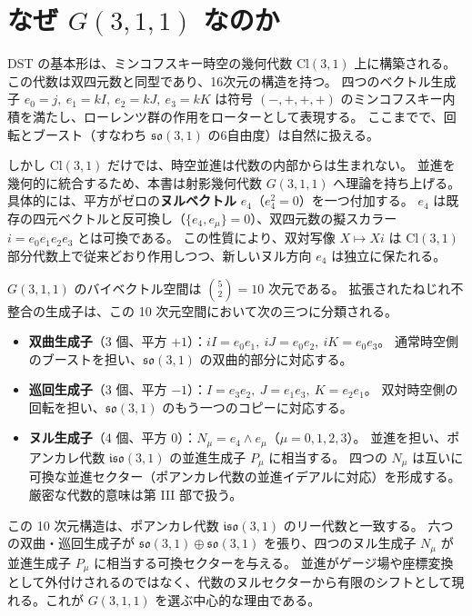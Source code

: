 \documentclass[dvipdfmx,a4paper,oneside]{jsbook}
\numberwithin{equation}{chapter}
\begin{document}
\section*{なぜ \(G(3,1,1)\) なのか}

DST の基本形は、ミンコフスキー時空の幾何代数 \(\mathrm{Cl}(3,1)\) 上に構築される。
この代数は双四元数と同型であり、16次元の構造を持つ。
四つのベクトル生成子 \(e_0 = j,\ e_1 = kI,\ e_2 = kJ,\ e_3 = kK\) は符号 \((-,+,+,+)\) のミンコフスキー内積を満たし、ローレンツ群の作用をローターとして表現する。
ここまでで、回転とブースト（すなわち \(\mathfrak{so}(3,1)\) の6自由度）は自然に扱える。

しかし \(\mathrm{Cl}(3,1)\) だけでは、時空並進は代数の内部からは生まれない。
並進を幾何的に統合するため、本書は射影幾何代数 \(G(3,1,1)\) へ理論を持ち上げる。
具体的には、平方がゼロの\textbf{ヌルベクトル} \(e_4\)（\(e_4^2 = 0\)）を一つ付加する。
\(e_4\) は既存の四元ベクトルと反可換し（\(\{e_4, e_\mu\} = 0\)）、双四元数の擬スカラー \(i = e_0 e_1 e_2 e_3\) とは可換である。
この性質により、双対写像 \(X \mapsto Xi\) は \(\mathrm{Cl}(3,1)\) 部分代数上で従来どおり作用しつつ、新しいヌル方向 \(e_4\) は独立に保たれる。

\(G(3,1,1)\) のバイベクトル空間は \(\binom{5}{2} = 10\) 次元である。
拡張されたねじれ不整合の生成子は、この 10 次元空間において次の三つに分類される。

\begin{itemize}[leftmargin=2em]
  \item \textbf{双曲生成子}（3 個、平方 \(+1\)）：\(iI = e_0 e_1,\ iJ = e_0 e_2,\ iK = e_0 e_3\)。
  通常時空側のブーストを担い、\(\mathfrak{so}(3,1)\) の双曲的部分に対応する。
  \item \textbf{巡回生成子}（3 個、平方 \(-1\)）：\(I = e_3 e_2,\ J = e_1 e_3,\ K = e_2 e_1\)。
  双対時空側の回転を担い、\(\mathfrak{so}(3,1)\) のもう一つのコピーに対応する。
  \item \textbf{ヌル生成子}（4 個、平方 \(0\)）：\(N_\mu = e_4 \wedge e_\mu\)（\(\mu = 0,1,2,3\)）。
  並進を担い、ポアンカレ代数 \(\mathfrak{iso}(3,1)\) の並進生成子 \(P_\mu\) に相当する。
  四つの \(N_\mu\) は互いに可換な並進セクター（ポアンカレ代数の並進イデアルに対応）を形成する。厳密な代数的意味は第 III 部で扱う。
\end{itemize}

この 10 次元構造は、ポアンカレ代数 \(\mathfrak{iso}(3,1)\) のリー代数と一致する。
六つの双曲・巡回生成子が \(\mathfrak{so}(3,1) \oplus \mathfrak{so}(3,1)\) を張り、四つのヌル生成子 \(N_\mu\) が並進生成子 \(P_\mu\) に相当する可換セクターを与える。
並進がゲージ場や座標変換として外付けされるのではなく、代数のヌルセクターから有限のシフトとして現れる。これが \(G(3,1,1)\) を選ぶ中心的な理由である。
\end{document}
